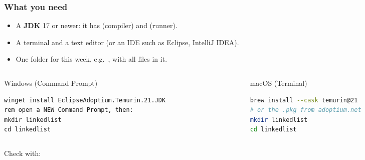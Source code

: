 \documentclass[aspectratio=169,10pt,compress]{beamer}
\begin{document}
\begin{frame}[t,fragile] \frametitle{What you need}
  \begin{itemize}
    \item A \textbf{JDK} 17 or newer: it has  (compiler) and  (runner).
    \item A terminal and a text editor (or an IDE such as Eclipse, IntelliJ IDEA).
    \item One folder for this week, e.g.\ , with all  files in it.
  \end{itemize}
  \begin{columns}[T]
    \begin{column}{0.48\textwidth}
      \begin{block}{Windows (Command Prompt)}
\begin{lstlisting}[style=codesnippet, language={}, basicstyle=\ttfamily\scriptsize]
winget install EclipseAdoptium.Temurin.21.JDK
rem open a NEW Command Prompt, then:
mkdir linkedlist
cd linkedlist
\end{lstlisting}
      \end{block}
    \end{column}
    \begin{column}{0.48\textwidth}
      \begin{block}{macOS (Terminal)}
\begin{lstlisting}[style=codesnippet, language=bash, basicstyle=\ttfamily\scriptsize]
brew install --cask temurin@21
# or the .pkg from adoptium.net
mkdir linkedlist
cd linkedlist
\end{lstlisting}
      \end{block}
    \end{column}
  \end{columns}
  \small Check with:
\end{frame}
\end{document}
